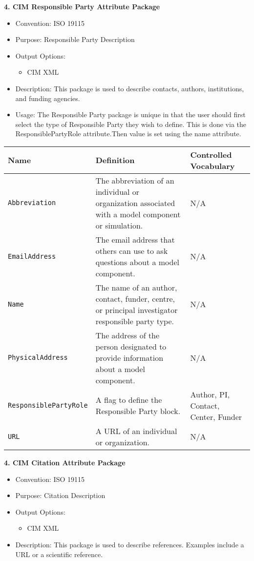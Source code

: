 \vspace{.20in}
{\bf 4. CIM Responsible Party Attribute Package}

\begin{itemize}
    \item Convention: ISO 19115
    \item Purpose: Responsible Party Description
    \item Output Options: 
    \begin{itemize}
        \item CIM XML 
    \end{itemize} 
    \item Description: This package is used to describe contacts, authors, institutions, and funding agencies. 
    \item Usage: The Responsible Party package is unique in that the user should first select the type of Responsible Party they wish to define. This is done via the ResponsiblePartyRole attribute.Then value is set using the name attribute.  
\end{itemize}


\begin{tabular}{|p{8cm}|p{20cm}|p{10cm}|}
     {\bf Name } & {\bf Definition} & {\bf Controlled Vocabulary} \\
     \hline\hline
     {\tt Abbreviation} & The abbreviation of an individual or organization associated with a model component or simulation. & N/A \\
     {\tt EmailAddress} & The email address that others can use to ask questions about a model component. & N/A \\
     {\tt Name} & The name of an author, contact, funder, centre, or principal investigator responsible party type. & N/A \\
     {\tt PhysicalAddress} & The address of the person designated to provide information about a model component. & N/A \\
     {\tt ResponsiblePartyRole} & A flag to define the Responsible Party block. & Author, PI, Contact, Center, Funder\\
     {\tt URL} & A URL of an individual or organization. & N/A \\
\end{tabular}


\vspace{.20in}
{\bf 4. CIM Citation Attribute Package}

\begin{itemize}
    \item Convention: ISO 19115
    \item Purpose: Citation Description
    \item Output Options: 
    \begin{itemize}
        \item CIM XML 
    \end{itemize} 
    \item Description: This package is used to describe references. Examples include a URL or a scientific reference. 
\end{itemize}


